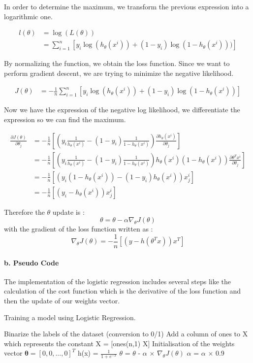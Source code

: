 \documentclass[a4paper,11pt]{article}
\begin{document}
In order to determine the maximum, we transform the previous expression into a logarithmic one.

\begin{align*}
l(\theta) &= \log(L(\theta))\\
&= \sum_{i = 1}^n [y_{i} \log(h_{\theta}(x^{i})) + (1 - y_i) \log(1 - h_{\theta}(x^{i})))]
\end{align*}

By normalizing the function, we obtain the loss function. Since we want to perform gradient descent, we are trying to minimize the negative likelihood.

\begin{align*}
J(\theta) &= -\frac{1}{n}\sum_{i=1}^{n}[ y_{i} \log(h_{\theta}(x^{i})) + (1 - y_i) \log(1 - h_{\theta}(x^{i}))]
\end{align*}

Now we have the expression of the negative log likelihood, we differentiate the expression so we can find the maximum.

\begin{align*}
\frac{\partial J(\theta)}{\partial \theta_{j}} &= -\frac{1}{n}[(y_i \frac{1}{h_{\theta}(x^{i})} - (1-y_i) \frac{1}{1-h_{\theta}(x^{i})})\frac{\partial h_{\theta}(x^{i})}{\partial \theta_{j}}]\\
&= -\frac{1}{n}[(y_i \frac{1}{h_{\theta}(x^{i})} - (1-y_i) \frac{1}{1-h_{\theta}(x^{i})})h_{\theta}(x^{i}) (1- h_{\theta}(x^{i})) \frac{\partial {\theta^T x^{i}}}{\partial \theta_{j}}] \\
&= -\frac{1}{n}[(y_i(1 - h_{\theta}(x^{i})) - (1 - y_i)h_{\theta}(x^{i}))x^{i}_{j}]\\
&= -\frac{1}{n}[(y_i - h_{\theta}(x^{i}))x^{i}_{j}]
\end{align*}

Therefore the $\theta$ update is  : 
$$ \theta = \theta - \alpha \nabla_{\theta} J(\theta) $$ with the gradient of the loss function written as :  $$\nabla_{\theta} J(\theta) = -\frac{1}{n}[(y - h(\theta^{T}x))x^{T}]$$ 

\paragraph*{b. Pseudo Code}

The implementation of the logistic regression includes several steps like the calculation of the cost function which is the derivative of the loss function and then the update of our weights vector.

\begin{algorithm}[H]
\caption{Training a model using Logistic Regression.}
\begin{algorithmic}[1]
\State Binarize the labels of the dataset (conversion to 0/1)
\State Add a column of ones to X which represents the constant X = [ones(n,1) X]
\State Initialisation  of the weights vector $\mathbf{\theta} = [0, 0, ..., 0]^{T}$
\State h(x) = $\frac{1}{1 + e^{-x}}$
\State $\theta$ = $\theta$ - $\alpha$ $\times$ $\nabla_{\theta}J(\theta)$
\State $\alpha$ = $\alpha$ $\times$ 0.9
\EndWhile
\end{algorithmic}
\end{algorithm}
\end{document}

